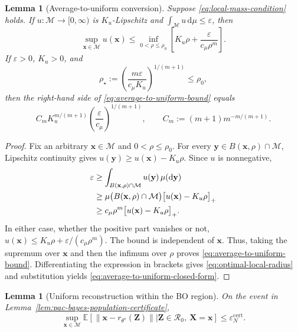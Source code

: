 \documentclass[pdflatex,sn-mathphys-num]{sn-jnl}%
\theoremstyle{thmstyleone}%
\newtheorem{lemma}[theorem]{Lemma}
\theoremstyle{thmstyletwo}%
\theoremstyle{thmstylethree}%
\begin{document}
\begin{appendices}
\begin{lemma}[Average-to-uniform conversion]
\label{lem:average-to-uniform}
Suppose \eqref{eq:local-mass-condition} holds.  If $u:\mathcal{M}\to[0,\infty)$ is $K_u$-Lipschitz and $\int_{\mathcal{M}}u\,\mathrm d\mu\leq\varepsilon$, then 
\begin{equation}
  \sup_{\mathbf{x}\in\mathcal{M}}u(\mathbf{x})
  \leq
  \inf_{0<\rho\leq\rho_0}
  \left[K_u\rho+\frac{\varepsilon}{c_\mu\rho^m}\right].
  \label{eq:average-to-uniform-bound}
\end{equation}
If $\varepsilon>0$, $K_u>0$, and
\begin{equation}
  \rho_\star
  :=\left(\frac{m\varepsilon}{c_\mu K_u}\right)^{1/(m+1)}
  \leq\rho_0,
  \label{eq:optimal-local-radius}
\end{equation}
then the right-hand side of \eqref{eq:average-to-uniform-bound} equals
\begin{equation}
  C_m K_u^{m/(m+1)}
  \left(\frac{\varepsilon}{c_\mu}\right)^{1/(m+1)},
  \qquad
  C_m:=(m+1)m^{-m/(m+1)}.
  \label{eq:average-to-uniform-closed-form}
\end{equation}
\end{lemma}

\begin{proof}
Fix an arbitrary $\mathbf{x}\in\mathcal{M}$ and $0<\rho\leq\rho_0$.  For every $\mathbf{y}\in B(\mathbf{x},\rho)\cap\mathcal{M}$, Lipschitz continuity gives $u(\mathbf{y})\geq u(\mathbf{x})-K_u\rho$.  Since $u$ is nonnegative,
\begin{align}
  \varepsilon
  &\geq \int_{B(\mathbf{x},\rho)\cap\mathcal{M}}
    u(\mathbf{y})\,\mu(\mathrm d\mathbf{y})
  \notag\\
  &\geq
  \mu\bigl(B(\mathbf{x},\rho)\cap\mathcal{M}\bigr)
  \bigl[u(\mathbf{x})-K_u\rho\bigr]_+
  \notag\\
  &\geq c_\mu\rho^m\bigl[u(\mathbf{x})-K_u\rho\bigr]_+.
  \label{eq:average-uniform-proof-core}
\end{align}
In either case, whether the positive part vanishes or not, $u(\mathbf{x})\leq K_u\rho+\varepsilon/(c_\mu\rho^m)$.  The bound is independent of $\mathbf{x}$. Thus, taking the supremum over $\mathbf{x}$ and then the infimum over $\rho$ proves \eqref{eq:average-to-uniform-bound}.  Differentiating the expression in brackets gives \eqref{eq:optimal-local-radius} and substitution yields \eqref{eq:average-to-uniform-closed-form}.
\end{proof}

\begin{lemma}[Uniform reconstruction within the BO region]
\label{lem:uniform-reconstruction-in-region}
On the event in Lemma~\ref{lem:pac-bayes-population-certificate},
\begin{equation}
  \sup_{\mathbf{x}\in\mathcal{M}}
  \mathbb{E}\!\left[
    \|\mathbf{x}-r_{\theta^\star}(\mathbf{Z})\|
    \mathrel{\big|} \mathbf{Z}\in\mathcal{R}_0,\ \mathbf{X}=\mathbf{x}
  \right]
  \leq \varepsilon_N^{\mathrm{cert}}.
  \label{eq:conditional-uniform-reconstruction}
\end{equation}
\end{lemma}


\end{appendices}
\end{document}
